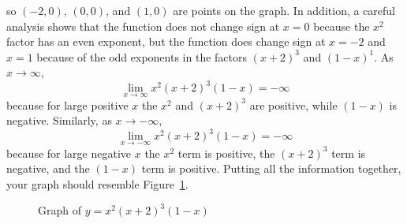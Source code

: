 \documentclass{article}
\newcommand{\ds}{\displaystyle}
\begin{document}
\begin{enumerate}
  so $(-2,0)$, $(0,0)$, and $(1,0)$ are points on the graph.  In
  addition, a careful analysis shows that the function does not change
  sign at $x=0$ because the $x^2$ factor has an even exponent, but the
  function does change sign at $x=-2$ and $x=1$ because of the odd
  exponents in the factors $(x+2)^3$ and $(1-x)^1$.  As $x\to\infty$,
  \begin{displaymath}
    \lim_{x\to\infty} x^2(x+2)^3(1-x) = -\infty
  \end{displaymath}
  because for large positive $x$ the $x^2$ and $(x+2)^3$ are positive,
  while $(1-x)$ is negative.  Similarly, as $x\to -\infty$,
  \begin{displaymath}
    \lim_{x\to -\infty} x^2(x+2)^3(1-x) = -\infty
  \end{displaymath}
  because for large negative $x$ the $x^2$ term is positive, the
  $(x+2)^3$ term is negative, and the $(1-x)$ term is positive.
  Putting all the information together, your graph should resemble
  Figure~\ref{fig:sixdeg}.
  \begin{figure}[htbp]
    \centering
    \caption{Graph of $\ds y=x^2(x+2)^3(1-x)$}
    \label{fig:sixdeg}
  \end{figure}

\end{enumerate}
\end{document}
